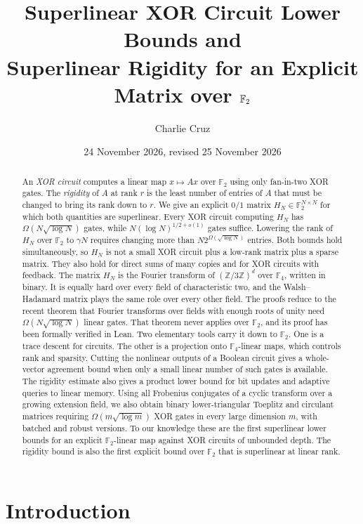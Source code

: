 \documentclass[11pt]{article}
\title{Superlinear XOR Circuit Lower Bounds and\\Superlinear Rigidity for an Explicit Matrix over $\F_2$}
\author{Charlie Cruz}
\date{24 November 2026, revised 25 November 2026}
\theoremstyle{definition}
\theoremstyle{remark}
\newcommand{\F}{\mathbb{F}}
\newcommand{\Z}{\mathbb{Z}}
\begin{document}
\maketitle
\begin{abstract}
An \emph{XOR circuit} computes a linear map $x\mapsto Ax$ over $\F_2$ using
only fan-in-two XOR gates. The \emph{rigidity} of $A$ at rank $r$ is the
least number of entries of $A$ that must be changed to bring its rank down
to $r$. We give an explicit $0/1$ matrix $H_N\in\F_2^{N\times N}$ for which
both quantities are superlinear. Every XOR circuit computing $H_N$ has
$\Omega(N\sqrt{\log N})$ gates, while $N(\log N)^{1/2+o(1)}$ gates suffice.
Lowering the rank of $H_N$ over $\F_2$ to $\gamma N$ requires changing more
than $N2^{\Omega(\sqrt{\log N})}$ entries. Both bounds hold simultaneously, so
$H_N$ is not a small XOR circuit plus a low-rank matrix plus a sparse matrix.
They also hold for direct sums of many copies and for XOR circuits with
feedback. The matrix $H_N$ is the Fourier transform of $(\Z/3\Z)^d$ over
$\F_4$, written in binary. It is equally hard over every field of
characteristic two, and the Walsh--Hadamard matrix plays the same role
over every other field. The proofs reduce to the recent theorem that
Fourier transforms over fields with enough roots of unity need
$\Omega(N\sqrt{\log N})$ linear gates. That theorem never applies over
$\F_2$, and its proof has been formally verified in Lean. Two elementary
tools carry it down to $\F_2$. One is a trace descent for circuits. The
other is a projection onto $\F_4$-linear maps, which controls rank and
sparsity. Cutting the nonlinear outputs of a Boolean circuit gives a
whole-vector agreement bound when only a small linear number of such
gates is available. The rigidity estimate also gives a product lower
bound for bit updates and adaptive queries to linear memory.
Using all Frobenius conjugates of a cyclic transform over a growing
extension field, we also obtain binary lower-triangular Toeplitz and
circulant matrices requiring $\Omega(m\sqrt{\log m})$ XOR gates in
every large dimension $m$, with batched and robust versions.
To our knowledge these are the first superlinear lower bounds
for an explicit $\F_2$-linear map against XOR circuits of unbounded depth.
The rigidity bound is also the first explicit bound over $\F_2$ that is
superlinear at linear rank.
\end{abstract}

\section{Introduction}
\end{document}

